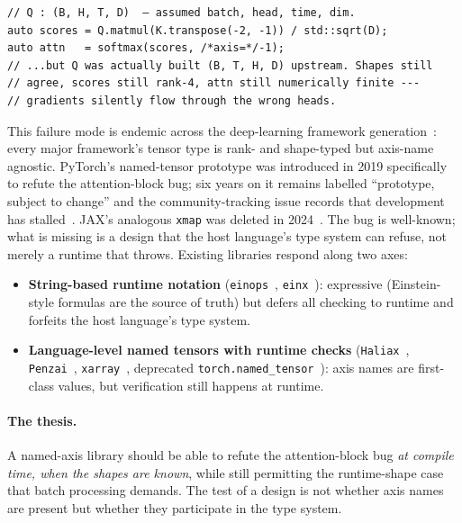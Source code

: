 \documentclass[10pt,twocolumn]{article}
\newcommand{\code}[1]{\texttt{#1}}
\begin{document}
\begin{lstlisting}[language=cppx,caption={The motivating bug. The
type system sees a $(B,H,T,D)$ tensor where the writer meant
$(B,T,H,D)$; the names live only in the comment.},
label={lst:intro-bug}]
// Q : (B, H, T, D)  — assumed batch, head, time, dim.
auto scores = Q.matmul(K.transpose(-2, -1)) / std::sqrt(D);
auto attn   = softmax(scores, /*axis=*/-1);
// ...but Q was actually built (B, T, H, D) upstream. Shapes still
// agree, scores still rank-4, attn still numerically finite ---
// gradients silently flow through the wrong heads.
\end{lstlisting}

This failure mode is endemic across the deep-learning framework
generation~\cite{paszke2019pytorch, ansel2024pytorch2, jax2018github,
abadi2016tensorflow}: every major framework's tensor type is rank-
and shape-typed but axis-name agnostic. PyTorch's named-tensor
prototype was introduced in 2019 specifically to refute the
attention-block bug; six years on it remains labelled ``prototype,
subject to change'' and the community-tracking issue records that
development has stalled~\cite{pytorch-named-tensors}. JAX's analogous
\code{xmap} was deleted in 2024~\cite{jax-xmap-deletion}. The bug is
well-known; what is missing is a design that the host language's
type system can refuse, not merely a runtime that throws.
Existing libraries respond along two axes:

\begin{itemize}
  \item \textbf{String-based runtime notation} (\code{einops}~\cite{rogozhnikov2022einops},
        \code{einx}~\cite{flick2026einx}): expressive (Einstein-style formulas
        are the source of truth) but defers all checking to runtime
        and forfeits the host language's type system.
  \item \textbf{Language-level named tensors with runtime checks}
        (\code{Haliax}~\cite{haliax}, \code{Penzai}~\cite{penzai},
        \code{xarray}~\cite{xarray}, deprecated
        \code{torch.named\_tensor}~\cite{pytorch-named-tensors}):
        axis names are first-class values, but verification still
        happens at runtime.
\end{itemize}

\paragraph{The thesis.}
A named-axis library should be able to refute the attention-block bug
\emph{at compile time, when the shapes are known}, while still
permitting the runtime-shape case that batch processing demands. The
test of a design is not whether axis names are present but whether they
participate in the type system.
\end{document}
